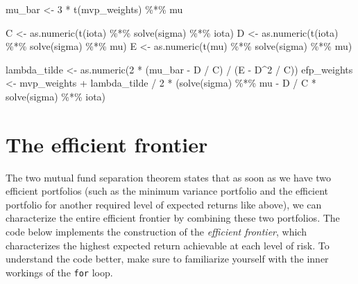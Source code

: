 \documentclass[
]{book}
\newenvironment{Shaded}{\begin{snugshade}}{\end{snugshade}}
\newcommand{\DecValTok}[1]{\textcolor[rgb]{0.06,0.06,0.06}{#1}}
\newcommand{\FunctionTok}[1]{\textcolor[rgb]{0,0,0}{#1}}
\newcommand{\NormalTok}[1]{#1}
\newcommand{\OtherTok}[1]{\textcolor[rgb]{0.37,0.37,0.37}{#1}}
\newcommand{\SpecialCharTok}[1]{\textcolor[rgb]{0,0,0}{#1}}
\begin{document}
\begin{Shaded}
\begin{Highlighting}[]
\NormalTok{mu\_bar }\OtherTok{\textless{}{-}} \DecValTok{3} \SpecialCharTok{*} \FunctionTok{t}\NormalTok{(mvp\_weights) }\SpecialCharTok{\%*\%}\NormalTok{ mu}

\NormalTok{C }\OtherTok{\textless{}{-}} \FunctionTok{as.numeric}\NormalTok{(}\FunctionTok{t}\NormalTok{(iota) }\SpecialCharTok{\%*\%} \FunctionTok{solve}\NormalTok{(sigma) }\SpecialCharTok{\%*\%}\NormalTok{ iota)}
\NormalTok{D }\OtherTok{\textless{}{-}} \FunctionTok{as.numeric}\NormalTok{(}\FunctionTok{t}\NormalTok{(iota) }\SpecialCharTok{\%*\%} \FunctionTok{solve}\NormalTok{(sigma) }\SpecialCharTok{\%*\%}\NormalTok{ mu)}
\NormalTok{E }\OtherTok{\textless{}{-}} \FunctionTok{as.numeric}\NormalTok{(}\FunctionTok{t}\NormalTok{(mu) }\SpecialCharTok{\%*\%} \FunctionTok{solve}\NormalTok{(sigma) }\SpecialCharTok{\%*\%}\NormalTok{ mu)}

\NormalTok{lambda\_tilde }\OtherTok{\textless{}{-}} \FunctionTok{as.numeric}\NormalTok{(}\DecValTok{2} \SpecialCharTok{*}\NormalTok{ (mu\_bar }\SpecialCharTok{{-}}\NormalTok{ D }\SpecialCharTok{/}\NormalTok{ C) }\SpecialCharTok{/}\NormalTok{ (E }\SpecialCharTok{{-}}\NormalTok{ D}\SpecialCharTok{\^{}}\DecValTok{2} \SpecialCharTok{/}\NormalTok{ C))}
\NormalTok{efp\_weights }\OtherTok{\textless{}{-}}\NormalTok{ mvp\_weights }\SpecialCharTok{+}\NormalTok{ lambda\_tilde }\SpecialCharTok{/} \DecValTok{2} \SpecialCharTok{*}\NormalTok{ (}\FunctionTok{solve}\NormalTok{(sigma) }\SpecialCharTok{\%*\%}\NormalTok{ mu }\SpecialCharTok{{-}}\NormalTok{ D }\SpecialCharTok{/}\NormalTok{ C }\SpecialCharTok{*} \FunctionTok{solve}\NormalTok{(sigma) }\SpecialCharTok{\%*\%}\NormalTok{ iota)}
\end{Highlighting}
\end{Shaded}

\hypertarget{the-efficient-frontier}{%
\section{The efficient frontier}\label{the-efficient-frontier}}

The two mutual fund separation theorem states that as soon as we have two efficient portfolios (such as the minimum variance portfolio and the efficient portfolio for another required level of expected returns like above), we can characterize the entire efficient frontier by combining these two portfolios. The code below implements the construction of the \emph{efficient frontier}, which characterizes the highest expected return achievable at each level of risk. To understand the code better, make sure to familiarize yourself with the inner workings of the \texttt{for} loop.
\end{document}
